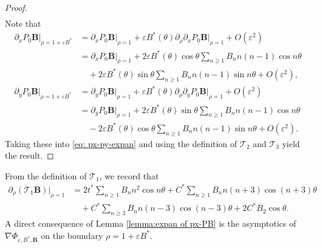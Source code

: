 \documentclass[12pt,reqno]{amsart}
\numberwithin{equation}{section}
\theoremstyle{definition}
\theoremstyle{remark}
\begin{document}
\begin{proof}
\begin{equation}
\begin{split}
\end{split}
\end{equation}
Note that 
\begin{align*}
\partial_xP_0  \textbf{B}\big|_{\rho=1+\varepsilon B^*}&=
\partial_xP_0  \textbf{B}\big|_{\rho=1}+\varepsilon B^*(\theta)\partial_{\rho}\partial_xP_0 \textbf{B} \big|_{\rho=1}+O(\varepsilon^2)\\
&=\partial_xP_0  \textbf{B}\big|_{\rho=1}
+2\varepsilon B^*(\theta)\cos\theta \sum_{n\ge1}B_nn(n-1)\cos n\theta \\
&\quad +2\varepsilon B^*(\theta)\sin\theta\sum_{n\ge1}B_nn(n-1)\sin n\theta+O(\varepsilon^2),\\
\partial_yP_0  \textbf{B}\big|_{\rho=1+\varepsilon B^*}&=
\partial_yP_0  \textbf{B}\big|_{\rho=1}+\varepsilon B^*(\theta)\partial_{\rho}\partial_yP_0 \textbf{B} \big|_{\rho=1}+O(\varepsilon^2)\\
&=\partial_yP_0  \textbf{B}\big|_{\rho=1}
+2\varepsilon B^*(\theta)\sin\theta \sum_{n\ge1}B_nn(n-1)\cos n\theta \\
&\quad -2\varepsilon B^*(\theta)\cos\theta\sum_{n\ge1}B_nn(n-1)\sin n\theta+O(\varepsilon^2).
\end{align*}
Taking these into \eqref{eq: px-py-expan} and using the definition of $ \mathcal{T}_2 $ and $ \mathcal{T}_3 $ yield the result.

\end{proof}
From the definition of $ \mathcal{T}_1 $, we record that
\begin{align*}
\partial_\rho(  \mathcal{T}_1  \textbf{B})\big|_{\rho=1}
&=2t^*  \sum_{n\ge1}B_nn^2\cos n\theta
+C^*\sum_{n\ge1}B_nn(n+3)\cos(n+3)\theta \\
&\quad +C^*\sum_{n\ge3}B_nn(n-3)\cos(n-3)\theta+2C^*B_2 \cos\theta.
\end{align*}
A direct consequence of Lemma \ref{lemma:expan of px-PB} is the asymptotics of $ \nabla\Phi_{\varepsilon, B^*,\textbf{B}} $ on the boundary $ \rho=1+\varepsilon B^*. $
\end{document}
